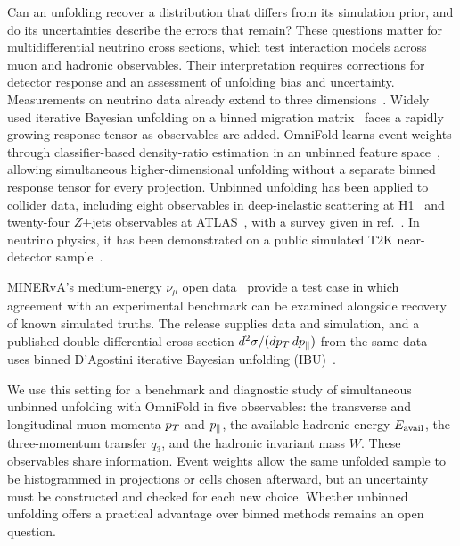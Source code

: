 Can an unfolding recover a distribution that differs from its simulation prior, and do its uncertainties describe the errors that remain? These questions matter for multidifferential neutrino cross sections, which test interaction models across muon and hadronic observables. Their interpretation requires corrections for detector response and an assessment of unfolding bias and uncertainty. Measurements on neutrino data already extend to three dimensions~\cite{MINERvA:2022qelike3d,MINERvA:2026qeleme,MicroBooNE:2023inc3d,NOvA:2026inc3d}. Widely used iterative Bayesian unfolding on a binned migration matrix~\cite{DAgostini:1994fjx} faces a rapidly growing response tensor as observables are added. OmniFold learns event weights through classifier-based density-ratio estimation in an unbinned feature space~\cite{Andreassen:2019cjw,Andreassen:2021zzk}, allowing simultaneous higher-dimensional unfolding without a separate binned response tensor for every projection. Unbinned unfolding has been applied to collider data, including eight observables in deep-inelastic scattering at H1~\cite{H1:2021wkz} and twenty-four $Z$+jets observables at ATLAS~\cite{ATLAS:2024jets}, with a survey given in ref.~\cite{Canelli:2025guide}. In neutrino physics, it has been demonstrated on a public simulated T2K near-detector sample~\cite{Huang:2025omnifold}.

MINERvA's medium-energy $\nu_{\mu}$ open data~\cite{MINERvA:OpenData} provide a test case in which agreement with an experimental benchmark can be examined alongside recovery of known simulated truths. The release supplies data and simulation, and a published double-differential cross section $d^{2}\sigma/(dp_{T}\,dp_{\parallel})$ from the same data~\cite{MINERvA:2021owq} uses binned D'Agostini iterative Bayesian unfolding (IBU)~\cite{DAgostini:1994fjx}.

We use this setting for a benchmark and diagnostic study of simultaneous unbinned unfolding with OmniFold in five observables: the transverse and longitudinal muon momenta $p_{T}$ and $p_{\parallel}$, the available hadronic energy $E_{\mathrm{avail}}$, the three-momentum transfer $q_{3}$, and the hadronic invariant mass $W$. These observables share information. Event weights allow the same unfolded sample to be histogrammed in projections or cells chosen afterward, but an uncertainty must be constructed and checked for each new choice. Whether unbinned unfolding offers a practical advantage over binned methods remains an open question.

